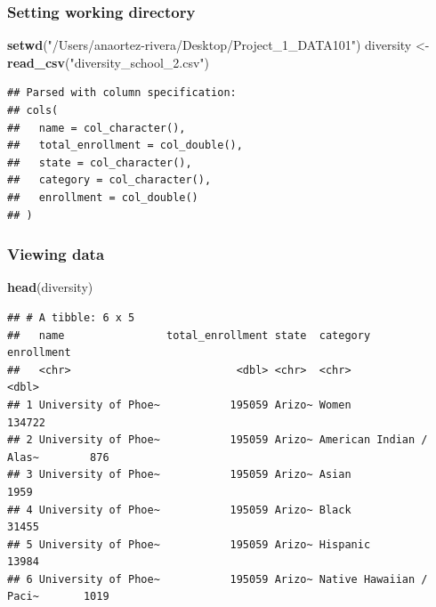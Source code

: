 \documentclass[
]{article}
\newenvironment{Shaded}{\begin{snugshade}}{\end{snugshade}}
\newcommand{\KeywordTok}[1]{\textcolor[rgb]{0.13,0.29,0.53}{\textbf{#1}}}
\newcommand{\NormalTok}[1]{#1}
\newcommand{\StringTok}[1]{\textcolor[rgb]{0.31,0.60,0.02}{#1}}
\begin{document}
\hypertarget{setting-working-directory}{%
\subsubsection{Setting working
directory}\label{setting-working-directory}}

\begin{Shaded}
\begin{Highlighting}[]
\KeywordTok{setwd}\NormalTok{(}\StringTok{"/Users/anaortez-rivera/Desktop/Project_1_DATA101"}\NormalTok{) }
\NormalTok{diversity <-}\StringTok{ }\KeywordTok{read_csv}\NormalTok{(}\StringTok{"diversity_school_2.csv"}\NormalTok{)}
\end{Highlighting}
\end{Shaded}

\begin{verbatim}
## Parsed with column specification:
## cols(
##   name = col_character(),
##   total_enrollment = col_double(),
##   state = col_character(),
##   category = col_character(),
##   enrollment = col_double()
## )
\end{verbatim}

\hypertarget{viewing-data}{%
\subsubsection{Viewing data}\label{viewing-data}}

\begin{Shaded}
\begin{Highlighting}[]
\KeywordTok{head}\NormalTok{(diversity)}
\end{Highlighting}
\end{Shaded}

\begin{verbatim}
## # A tibble: 6 x 5
##   name                total_enrollment state  category                enrollment
##   <chr>                          <dbl> <chr>  <chr>                        <dbl>
## 1 University of Phoe~           195059 Arizo~ Women                       134722
## 2 University of Phoe~           195059 Arizo~ American Indian / Alas~        876
## 3 University of Phoe~           195059 Arizo~ Asian                         1959
## 4 University of Phoe~           195059 Arizo~ Black                        31455
## 5 University of Phoe~           195059 Arizo~ Hispanic                     13984
## 6 University of Phoe~           195059 Arizo~ Native Hawaiian / Paci~       1019
\end{verbatim}
\end{document}
